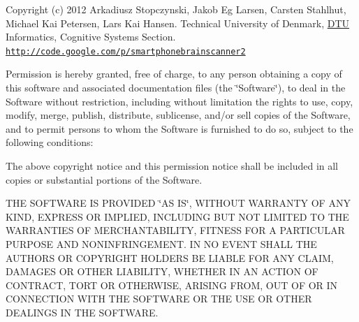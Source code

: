Copyright (c) 2012 Arkadiusz Stopczynski, Jakob Eg Larsen, Carsten Stahlhut, Michael Kai Petersen, Lars Kai Hansen. Technical University of Denmark, \hyperlink{namespaceDTU}{D\-T\-U} Informatics, Cognitive Systems Section. \href{http://code.google.com/p/smartphonebrainscanner2}{\tt http\-://code.\-google.\-com/p/smartphonebrainscanner2}

Permission is hereby granted, free of charge, to any person obtaining a copy of this software and associated documentation files (the \char`\"{}\-Software\char`\"{}), to deal in the Software without restriction, including without limitation the rights to use, copy, modify, merge, publish, distribute, sublicense, and/or sell copies of the Software, and to permit persons to whom the Software is furnished to do so, subject to the following conditions\-:

The above copyright notice and this permission notice shall be included in all copies or substantial portions of the Software.

T\-H\-E S\-O\-F\-T\-W\-A\-R\-E I\-S P\-R\-O\-V\-I\-D\-E\-D \char`\"{}\-A\-S I\-S\char`\"{}, W\-I\-T\-H\-O\-U\-T W\-A\-R\-R\-A\-N\-T\-Y O\-F A\-N\-Y K\-I\-N\-D, E\-X\-P\-R\-E\-S\-S O\-R I\-M\-P\-L\-I\-E\-D, I\-N\-C\-L\-U\-D\-I\-N\-G B\-U\-T N\-O\-T L\-I\-M\-I\-T\-E\-D T\-O T\-H\-E W\-A\-R\-R\-A\-N\-T\-I\-E\-S O\-F M\-E\-R\-C\-H\-A\-N\-T\-A\-B\-I\-L\-I\-T\-Y, F\-I\-T\-N\-E\-S\-S F\-O\-R A P\-A\-R\-T\-I\-C\-U\-L\-A\-R P\-U\-R\-P\-O\-S\-E A\-N\-D N\-O\-N\-I\-N\-F\-R\-I\-N\-G\-E\-M\-E\-N\-T. I\-N N\-O E\-V\-E\-N\-T S\-H\-A\-L\-L T\-H\-E A\-U\-T\-H\-O\-R\-S O\-R C\-O\-P\-Y\-R\-I\-G\-H\-T H\-O\-L\-D\-E\-R\-S B\-E L\-I\-A\-B\-L\-E F\-O\-R A\-N\-Y C\-L\-A\-I\-M, D\-A\-M\-A\-G\-E\-S O\-R O\-T\-H\-E\-R L\-I\-A\-B\-I\-L\-I\-T\-Y, W\-H\-E\-T\-H\-E\-R I\-N A\-N A\-C\-T\-I\-O\-N O\-F C\-O\-N\-T\-R\-A\-C\-T, T\-O\-R\-T O\-R O\-T\-H\-E\-R\-W\-I\-S\-E, A\-R\-I\-S\-I\-N\-G F\-R\-O\-M, O\-U\-T O\-F O\-R I\-N C\-O\-N\-N\-E\-C\-T\-I\-O\-N W\-I\-T\-H T\-H\-E S\-O\-F\-T\-W\-A\-R\-E O\-R T\-H\-E U\-S\-E O\-R O\-T\-H\-E\-R D\-E\-A\-L\-I\-N\-G\-S I\-N T\-H\-E S\-O\-F\-T\-W\-A\-R\-E. 


